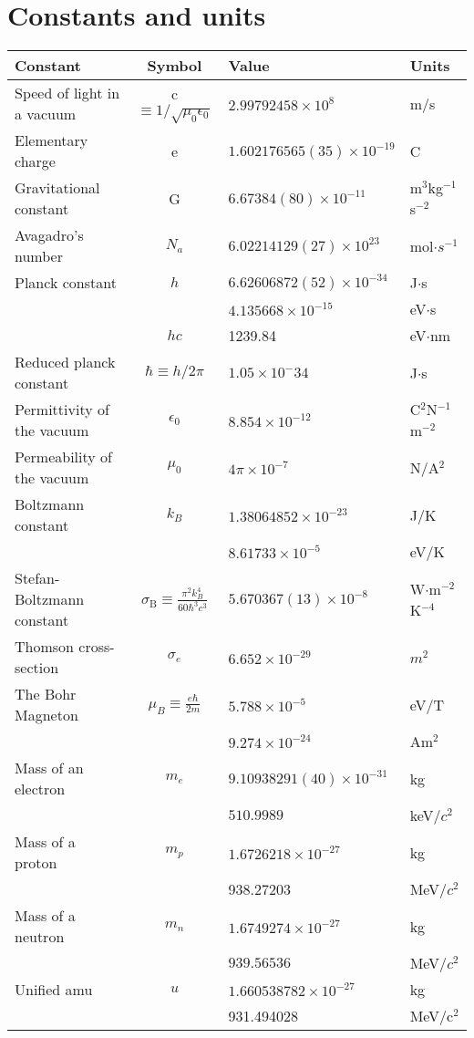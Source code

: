 \chapter{Constants and units}
\thispagestyle{fancy}
\begin{fancybox}{}	
\begin{center}
	\begin{tabular}{   l  |  c  |  l  |  l  }
		Constant & Symbol & Value & Units \\
		\hline
		Speed of light in a vacuum& c $\equiv 1/\sqrt{\mu_0\epsilon_0}$ & $2.99792458 \times 10^8$ & m/s \\
		Elementary charge& e & $1.602176565(35)\times 10^{-19}$ & C\\
		Gravitational constant& G & $6.67384(80)\times 10^{-11}$ & m$^3$kg$^{-1}$s$^{-2}$\\
		Avagadro's number& $N_a$ & $6.02214129(27)\times 10^{23}$ & mol$\cdot s^{-1}$\\
		Planck constant & $h$ & $ 6.62606872(52) \times 10^{-34}$ & J$\cdot$s \\
		& & $4.135668 \times 10^{-15}$ & eV$\cdot$s \\
		& $hc$ & 1239.84 & eV$\cdot$nm \\
		Reduced planck constant& $\hbar \equiv h/2\pi$ & $1.05\times 10^-{34}$ & J$\cdot$s\\
		Permittivity of the vacuum & $\epsilon_0$ & $8.854\times 10^{-12}$ & C$^2$N$^{-1}$m$^{-2}$ \\
		Permeability of the vacuum & $\mu_0$ & $4\pi\times 10^{-7}$ & N/A$^{2}$ \\
		Boltzmann constant & $k_B$ & $1.38064852\times 10^{-23}$ & J/K \\
				 & & $8.61733\times 10^{-5}$ & eV/K \\
		Stefan-Boltzmann constant & $\sigma_{\textrm{B}} \equiv \frac{\pi^2k_B^4}{60\hbar^3c^3}$ & $5.670367(13)\times 10^{-8}$ & W$\cdot$m$^{-2}$K$^{-4}$ \\
		Thomson cross-section & $\sigma_e$ & $6.652\times10^{-29}$ & $m^2$ \\
		The Bohr Magneton & $\mu_B \equiv \frac{e\hbar}{2m}$ & $5.788\times 10^{-5}$ & eV/T \\
		& & $9.274\times 10^{-24}$ & Am$^2$ \\
		Mass of an electron & $m_e$ & $9.10938291(40)\times 10^{-31}$ & kg\\
		&  & $510.9989$ & keV/$c^2$\\
		Mass of a proton& $m_p$ & $1.6726218 \times 10^{-27}$ & kg\\
		&  & 938.27203 & MeV/$c^2$\\
		Mass of a neutron& $m_n$   & $1.6749274 \times 10^{-27}$ & kg \\
		& & $939.56536$ & MeV/$c^2$	\\
		Unified amu & $u$ &  $1.660538782\times 10^{-27}$ & kg \\
		  &   &  931.494028 & MeV/c$^2$ 
	\end{tabular}
\end{center}
\end{fancybox}

